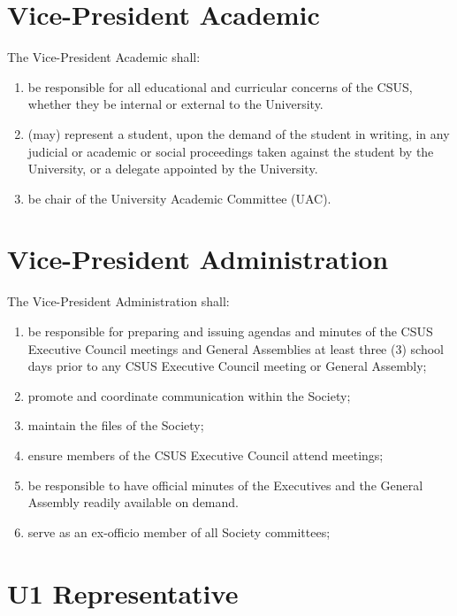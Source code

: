 \section{Vice-President
Academic}\label{vice-president-academic}

The Vice-President Academic shall:

\begin{enumerate}
\def\labelenumi{\arabic{enumi}.}
\item
  be responsible for all educational and curricular concerns of the
  CSUS, whether they be internal or external to the University.
\item
  (may) represent a student, upon the demand of the student in writing,
  in any judicial or academic or social proceedings taken against the
  student by the University, or a delegate appointed by the University.
\item
  be chair of the University Academic Committee (UAC).
\end{enumerate}

\section{Vice-President
Administration}\label{vice-president-administration}

The Vice-President Administration shall:

\begin{enumerate}
\def\labelenumi{\arabic{enumi}.}
\item
  be responsible for preparing and issuing agendas and minutes of the
  CSUS Executive Council meetings and General Assemblies at least three
  (3) school days prior to any CSUS Executive Council meeting or General
  Assembly;
\item
  promote and coordinate communication within the Society;
\item
  maintain the files of the Society;
\item
  ensure members of the CSUS Executive Council attend meetings;
\item
  be responsible to have official minutes of the Executives and the
  General Assembly readily available on demand.
\item
  serve as an ex-officio member of all Society committees;
\end{enumerate}

\section{U1 Representative}\label{u1-representative}

